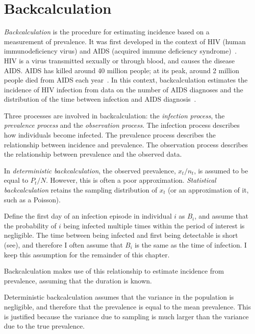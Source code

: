 \documentclass[thesis.tex]{subfiles}
\begin{document}
\section{Backcalculation}

\emph{Backcalculation} is the procedure for estimating incidence based on a measurement of prevalence.
It was first developed in the context of HIV (human immunodeficiency virus) and AIDS (acquired immune deficiency syndrome)~\autocite{brookmeyerMethod}.
HIV is a virus transmitted sexually or through blood, and causes the disease AIDS.
AIDS has killed around 40 million people; at its peak, around 2 million people died from AIDS each year~\autocite{unaids2023}.
In this context, backcalculation estimates the incidence of HIV infection from data on the number of AIDS diagnoses and the distribution of the time between infection and AIDS diagnosis~\autocites{brookmeyerBackcalculation}{brookmeyerMeasuring}.

Three processes are involved in backcalculation: the \emph{infection process}, the \emph{prevalence process} and the \emph{observation process}.
The infection process describes how individuals become infected.
The prevalence process describes the relationship between incidence and prevalence.
The observation process describes the relationship between prevalence and the observed data.

In \emph{deterministic backcalculation}, the observed prevalence, $x_t/n_t$, is assumed to be equal to $P_t/N$.
However, this is often a poor approximation.
\emph{Statistical backcalculation} retains the sampling distribution of $x_t$ (or an approximation of it, such as a Poisson).

Define the first day of an infection episode in individual $i$ as $B_i$, and assume that the probability of $i$ being infected multiple times within the period of interest is negligible.
The time between being infected and first being detectable is short (see), and therefore I often assume that $B_i$ is the same as the time of infection.
I keep this assumption for the remainder of this chapter.


Backcalculation makes use of this relationship to estimate incidence from prevalence, assuming that the duration is known.

Deterministic backcalculation assumes that the variance in the population is negligible, and therefore that the prevalence is equal to the mean prevalence.
This is justified because the variance due to sampling is much larger than the variance due to the true prevalence.
\end{document}
